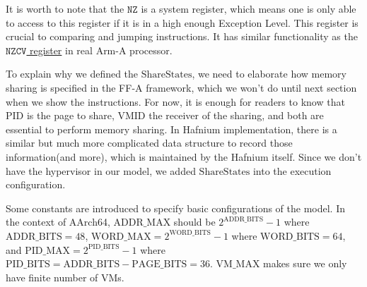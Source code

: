\documentclass[a4paper]{article}
\newcommand*{\SSS}{\text{ShareStates}}
\newcommand*{\PID}{\text{PID}}
\newcommand*{\VMID}{\text{VMID}}
\newcommand*{\PABITS}{\text{ADDR\_BITS}}
\newcommand*{\PPBITS}{\text{PAGE\_BITS}}
\newcommand*{\PPIDBITS}{\text{PID\_BITS}}
\newcommand*{\PAMAX}{\text{ADDR\_MAX}}
\newcommand*{\PPIDMAX}{\text{PID\_MAX}}
\newcommand*{\PWBITS}{\text{WORD\_BITS}}
\newcommand*{\PWMAX}{\text{WORD\_MAX}}
\newcommand*{\PVMMAX}{\text{VM\_MAX}}
\begin{document}
It is worth to note that the $\mathtt{NZ}$ is a system register, which means one
is only able to access to this register if it is in a high enough Exception Level.
This register is crucial to comparing and jumping instructions. It has similar
functionality as the \href{https://developer.arm.com/docs/ddi0595/h/aarch64-system-registers/nzcv}
{$\mathtt{NZCV}$ register} in real Arm-A processor.

To explain why we defined the $\SSS$, we need to elaborate how memory sharing is
specified in the FF-A framework, which we won't do until next section when we
show the instructions. For now, it is enough for readers to know that $\PID$ is
the page to share, $\VMID$ the receiver of the sharing, and both are essential
to perform memory sharing. In Hafnium implementation, there is a similar but
much more complicated data structure to record those information(and more),
which is maintained by the Hafnium itself. Since we don't have the hypervisor in
our model, we added $\SSS$ into the execution configuration.

Some constants are introduced to specify basic configurations of the model. In
the context of AArch64, $\PAMAX$ should be $2^{\PABITS} - 1$ where
$\PABITS = 48$, $\PWMAX = 2^{\PWBITS} -1$ where $\PWBITS = 64$, and
$\PPIDMAX = 2^{\PPIDBITS}-1$ where $\PPIDBITS = \PABITS - \PPBITS = 36$.
$\PVMMAX$ makes sure we only have finite number of VMs.
\end{document}
